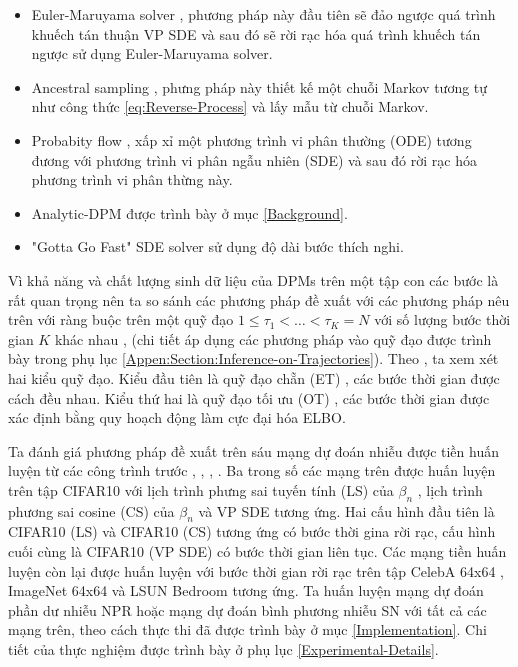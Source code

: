 \documentclass[14pt, a4paper]{article}
\numberwithin{equation}{section}
\numberwithin{figure}{section}
\numberwithin{dl}{section}
\numberwithin{md}{section}
\numberwithin{bd}{section}
\numberwithin{dn}{section}
\numberwithin{hq}{section}
\begin{document}
    \begin{itemize}
        \item Euler-Maruyama solver \cite{song2020score}, phương pháp này đầu tiên sẽ đảo ngược quá trình khuếch tán thuận VP SDE và sau đó sẽ rời rạc hóa quá trình khuếch tán ngược sử dụng Euler-Maruyama solver.
        \item Ancestral sampling \cite{song2020score}, phưng pháp này thiết kế một chuỗi Markov tương tự như công thức \ref{eq:Reverse-Process} và lấy mẫu từ chuỗi Markov.
        \item Probabity flow \cite{song2020score}, xấp xỉ một phương trình vi phân thường (ODE) tương đương với phương trình vi phân ngẫu nhiên (SDE) và sau đó rời rạc hóa phương trình vi phân thừng này.
        \item Analytic-DPM \cite{bao2021analytic} được trình bày ở mục \ref{Background}.
        \item "Gotta Go Fast" SDE solver \cite{jolicoeur2021gotta} sử dụng độ dài bước thích nghi.
    \end{itemize}

    Vì khả năng và chất lượng sinh dữ liệu của DPMs trên một tập con các bước là rất quan trọng nên ta so sánh các phương pháp đề xuất với các phương pháp nêu trên với ràng buộc trên một quỹ đạo
    $1 \leq \tau_1 < \dots < \tau_K = N$ với số lượng bước thời gian $K$ khác nhau \cite{song2020denoising}, \cite{bao2021analytic} (chi tiết áp dụng các phương pháp vào quỹ đạo được trình bày trong phụ lục \ref{Appen:Section:Inference-on-Trajectories}).
    Theo \cite{bao2021analytic}, ta xem xét hai kiểu quỹ đạo. Kiểu đầu tiên là quỹ đạo chẵn (ET) \cite{nichol2021improved}, các bước thời gian được cách đều nhau. Kiểu thứ hai là quỹ đạo tối ưu (OT) \cite{watson2021learning}, 
    các bước thời gian được xác định bằng quy hoạch động làm cực đại hóa ELBO.

    Ta đánh giá phương pháp đề xuất trên sáu mạng dự đoán nhiễu được tiền huấn luyện từ các công trình trước \cite{ho2020denoising}, \cite{song2020denoising}, \cite{nichol2021improved}, \cite{bao2021analytic}.
    Ba trong số các mạng trên được huấn luyện trên tập CIFAR10 \cite{krizhevsky2009learning} với lịch trình phưng sai tuyến tính (LS) của $\beta_n$ \cite{ho2020denoising},
    lịch trình phương sai cosine (CS) của $\beta_n$ \cite{nichol2021improved} và VP SDE \cite{song2020score} tương ứng.
    Hai cấu hình đầu tiên là CIFAR10 (LS) và CIFAR10 (CS) tương ứng có bước thời gina rời rạc, cấu hình cuối cùng là CIFAR10 (VP SDE) có bước thời gian liên tục.
    Các mạng tiền huấn luyện còn lại được huấn luyện với bước thời gian rời rạc trên tập CelebA 64x64 \cite{liu2015deep}, ImageNet 64x64 \cite{deng2009imagenet} và LSUN Bedroom \cite{yu2015lsun} tương ứng.
    Ta huấn luyện mạng dự đoán phần dư nhiễu NPR hoặc mạng dự đoán bình phương nhiễu SN với tất cả các mạng trên, theo cách thực thi đã được trình bày ở mục \ref{Implementation}.
    Chi tiết của thực nghiệm được trình bày ở phụ lục \ref{Experimental-Details}.
\end{document}
